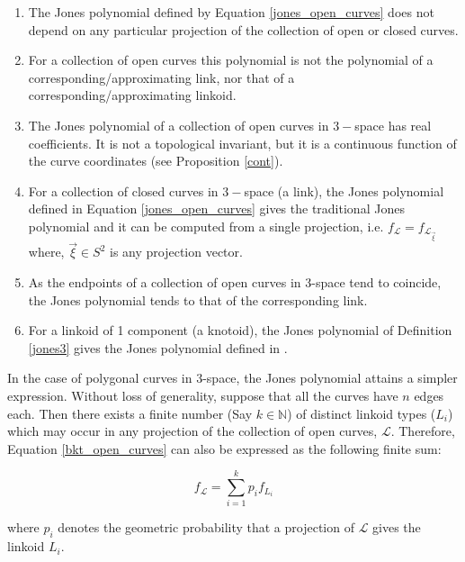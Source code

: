 \documentclass{article}
\begin{document}
\begin{enumerate}
    \item The Jones polynomial defined by Equation \ref{jones_open_curves} does not depend on any particular projection of the collection of open or closed curves.
    \item For a collection of open curves this polynomial is not the polynomial of a corresponding/approximating
link, nor that of a corresponding/approximating linkoid.
    \item The Jones polynomial of a collection of open curves in $3-$space has real coefficients. It is not a topological invariant, but it is a continuous function of the curve coordinates (see Proposition \ref{cont}).
    \item For a collection of closed curves in $3-$space (a link), the Jones polynomial defined in Equation \ref{jones_open_curves} gives the traditional Jones polynomial and it can be computed from a single projection, i.e. \quad $f_{\mathcal{L}}=f_{\mathcal{L}_{\vec{\xi}}}$ \quad where, $\vec{\xi} \in S^2$ is any projection vector.
    \item As the endpoints of a collection of open curves in 3-space tend to coincide, the Jones polynomial tends to that of the corresponding link.
    \item For a linkoid of 1 component (a knotoid), the Jones polynomial of Definition \ref{jones3} gives the Jones polynomial defined in \cite{Panagiotou2020b}.
\end{enumerate}




In the case of polygonal curves in 3-space, the Jones polynomial attains a simpler expression. Without loss of generality, suppose that all the curves have $n$ edges each. Then there exists a finite number (Say $k \in \mathbb{N}$) of distinct linkoid types ($L_i$)  which may occur in any projection of the collection of open curves, $\mathcal{L}$. Therefore, Equation \ref{bkt_open_curves} can also be expressed as the following finite sum:

\begin{equation}
f_{\mathcal{L}} = \sum_{i=1}^k p_i f_{L_i}
    \label{finte_sum_bkt}
\end{equation}

\noindent where $p_i$ denotes the geometric probability that a projection of $\mathcal{L}$ gives the linkoid $L_i$.
\end{document}

